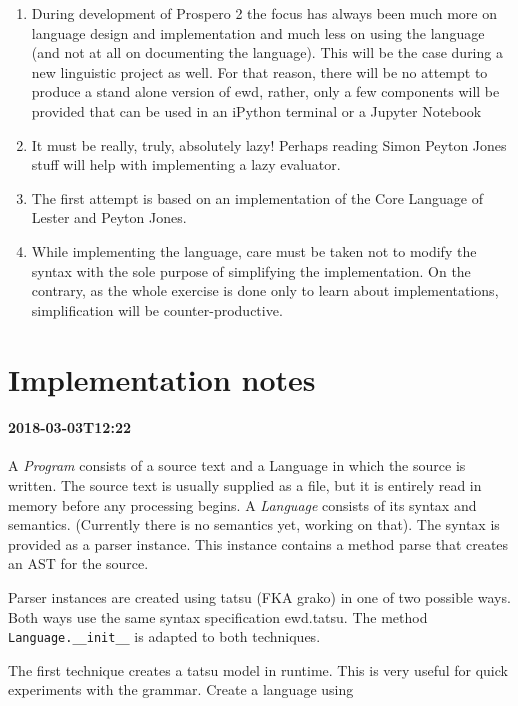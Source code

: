 \documentclass[11pt, a4paper]{article}
\begin{document}
\begin{enumerate}
\item During development of Prospero 2 the focus has always been much more on language 
design and implementation and much less on using the language (and not at all on 
documenting the language). This will be the case during a new linguistic project as well. For that reason, there will be no attempt to produce a stand alone version of ewd, rather, only a few components will be provided that can be used in an iPython terminal or a Jupyter Notebook

\item It must be really, truly, absolutely lazy! Perhaps reading Simon Peyton Jones 
stuff will help with implementing a lazy evaluator.

\item The first attempt is based on an implementation of the Core Language of Lester and Peyton Jones.

\item While implementing the language, care must be taken not to modify the syntax with the sole purpose of simplifying the implementation.
On the contrary, as the whole exercise is done only to learn about implementations, simplification will be counter-productive.

\end{enumerate}

\section{Implementation notes}

\paragraph{2018-03-03T12:22}

A \emph{Program} consists of a source text and a Language in which the source is written. 
The source text is usually supplied as a file, but it is entirely read in memory before any processing begins.
A \emph{Language} consists of its syntax and semantics. (Currently there is no semantics yet, working on that). 
The syntax is provided as a parser instance.
This instance contains a method parse that creates an AST for the source.

Parser instances are created using tatsu (FKA grako) in one of two possible ways. 
Both ways use the same syntax specification ewd.tatsu. 
The method \verb|Language.__init__| is adapted to both techniques.

The first technique creates a tatsu model in runtime. 
This is very useful for quick experiments with the grammar. 
Create a language using
\end{document}
